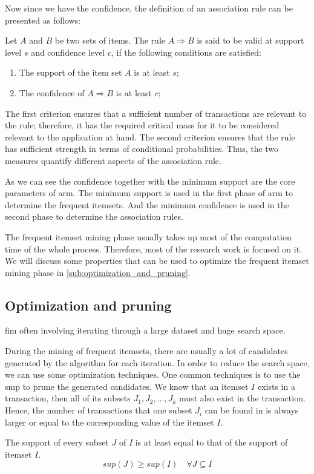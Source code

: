 Now since we have the confidence, the definition of an association rule can be presented as follows:
\begin{definition}
    Let $A$ and $B$ be two sets of items.
    The rule $A \Rightarrow B$ is said to be valid at support level $s$ and confidence level $c$, if the following conditions are satisfied:
    \begin{enumerate}
        \item The support of the item set $A$ is at least $s$;
        \item The confidence of $A \Rightarrow B$ is at least $c$;
    \end{enumerate}
    The first criterion ensures that a sufficient number of transactions are relevant to the rule; therefore, it has the required critical mass for it to be considered relevant to the application at hand.
    The second criterion ensures that the rule has sufficient strength in terms of conditional probabilities.
    Thus, the two measures quantify different aspects of the association rule.
\end{definition}
As we can see the confidence together with the minimum support are the core parameters of \acl{arm}.
The minimum support is used in the first phase of \acl{arm} to determine the frequent itemsets.
And the minimum confidence is used in the second phase to determine the association rules.

The frequent itemset mining phase usually takes up most of the computation time of the whole process.
Therefore, most of the research work is focused on it.
We will discuss some properties that can be used to optimize the frequent itemset mining phase in \autoref{sub:optimization_and_pruning}.
\subsection{Optimization and pruning}
\label{sub:optimization_and_pruning}
\Acl{fim} often involving iterating through a large dataset and huge search space.

During the mining of frequent itemsets, there are usually a lot of candidates generated by the algorithm for each iteration.
In order to reduce the search space, we can use some optimization techniques.
One common techniques is to use the \acl{smp} to prune the generated candidates.
We know that an itemset $I$ exists in a transaction, then all of its subsets $J_1, J_2, \dots, J_k$ must also exist in the transaction.
Hence, the number of transactions that one subset $J_i$ can be found in is always larger or equal to the corresponding value of the itemset $I$.
\begin{definition}
    The support of every subset $J$ of $I$ is at least equal to that of the support of itemset $I$.
    \begin{equation}
        sup(J) \geq sup(I) \quad \forall J \subseteq I
    \end{equation}
\end{definition}

